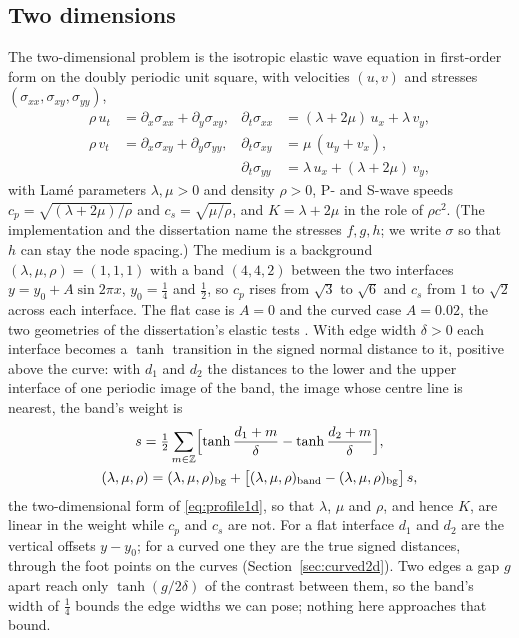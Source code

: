 \documentclass[11pt]{amsart}
\theoremstyle{definition}
\theoremstyle{remark}
\newcommand{\px}{\partial_x}
\newcommand{\py}{\partial_y}
\begin{document}
\subsection{Two dimensions}
\label{sec:setting2d}
The two-dimensional problem is the isotropic elastic wave equation in
first-order form on the doubly periodic unit square, with velocities
$(u, v)$ and stresses $(\sigma_{xx}, \sigma_{xy}, \sigma_{yy})$,
\begin{equation}
  \label{eq:sys2d}
  \begin{aligned}
    \rho\, u_t &= \px \sigma_{xx} + \py \sigma_{xy}, &
    \partial_t \sigma_{xx} &= (\lambda + 2\mu)\, u_x + \lambda\, v_y, \\
    \rho\, v_t &= \px \sigma_{xy} + \py \sigma_{yy}, &
    \partial_t \sigma_{xy} &= \mu\, (u_y + v_x), \\
    & & \partial_t \sigma_{yy} &= \lambda\, u_x + (\lambda + 2\mu)\, v_y,
  \end{aligned}
\end{equation}
with Lam\'e parameters $\lambda, \mu > 0$ and density $\rho > 0$, P- and
S-wave speeds $c_p = \sqrt{(\lambda + 2\mu) / \rho}$ and
$c_s = \sqrt{\mu / \rho}$, and $K = \lambda + 2\mu$ in the role of
$\rho c^2$. (The implementation and the dissertation name the stresses
$f, g, h$; we write $\sigma$ so that $h$ can stay the node spacing.)
The medium is a background $(\lambda, \mu, \rho) = (1, 1, 1)$ with a band
$(4, 4, 2)$ between the two interfaces $y = y_0 + A \sin 2\pi x$,
$y_0 = \tfrac14$ and $\tfrac12$, so $c_p$ rises from $\sqrt 3$ to
$\sqrt 6$ and $c_s$ from $1$ to $\sqrt 2$ across each interface. The
flat case is $A = 0$ and the curved case $A = 0.02$, the two geometries
of the dissertation's elastic tests \cite{Martin2016}. With edge width
$\delta > 0$ each interface becomes a $\tanh$ transition in the signed
normal distance to it, positive above the curve: with $d_1$ and $d_2$ the
distances to the lower and the upper interface of one periodic image of
the band, the image whose centre line is nearest, the band's weight is
\begin{equation}
  \label{eq:profile2d}
  \begin{gathered}
  s = \tfrac12 \sum_{m \in \mathbb{Z}} \Bigl[
    \tanh\frac{d_1 + m}{\delta} - \tanh\frac{d_2 + m}{\delta}
  \Bigr], \\
  (\lambda, \mu, \rho) = (\lambda, \mu, \rho)_{\mathrm{bg}}
  + \bigl[ (\lambda, \mu, \rho)_{\mathrm{band}}
  - (\lambda, \mu, \rho)_{\mathrm{bg}} \bigr]\, s,
  \end{gathered}
\end{equation}
the two-dimensional form of \eqref{eq:profile1d}, so that $\lambda$,
$\mu$ and $\rho$, and hence $K$, are linear in the weight while $c_p$
and $c_s$ are not. For a flat interface $d_1$ and $d_2$ are the vertical
offsets $y - y_0$; for a curved one they are the true signed distances,
through the foot points on the curves (Section~\ref{sec:curved2d}). Two edges a gap $g$ apart reach
only $\tanh(g / 2\delta)$ of the contrast between them, so the band's
width of $\tfrac14$ bounds the edge widths we can pose; nothing here
approaches that bound.
\end{document}
